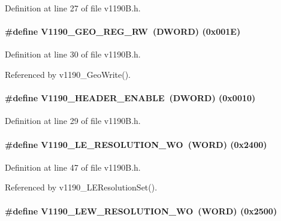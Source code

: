 Definition at line 27 of file v1190B.h.
\paragraph[{V1190\_\-GEO\_\-REG\_\-RW}]{\setlength{\rightskip}{0pt plus 5cm}\#define V1190\_\-GEO\_\-REG\_\-RW~({\bf DWORD}) (0x001E)}\hfill\label{v1190B_8h_a508f023442807f8565a81cafcfa85ba5}


Definition at line 30 of file v1190B.h.

Referenced by v1190\_\-GeoWrite().
\paragraph[{V1190\_\-HEADER\_\-ENABLE}]{\setlength{\rightskip}{0pt plus 5cm}\#define V1190\_\-HEADER\_\-ENABLE~({\bf DWORD}) (0x0010)}\hfill\label{v1190B_8h_affcd2dac5d0ae42527e1623416d3b491}


Definition at line 29 of file v1190B.h.
\paragraph[{V1190\_\-LE\_\-RESOLUTION\_\-WO}]{\setlength{\rightskip}{0pt plus 5cm}\#define V1190\_\-LE\_\-RESOLUTION\_\-WO~({\bf WORD}) (0x2400)}\hfill\label{v1190B_8h_aaa38e24baa18a0027ff64ad12339f8dd}


Definition at line 47 of file v1190B.h.

Referenced by v1190\_\-LEResolutionSet().
\paragraph[{V1190\_\-LEW\_\-RESOLUTION\_\-WO}]{\setlength{\rightskip}{0pt plus 5cm}\#define V1190\_\-LEW\_\-RESOLUTION\_\-WO~({\bf WORD}) (0x2500)}\hfill\label{v1190B_8h_a4aa2dd8ff08d01fbe2a9b996b770225f}


